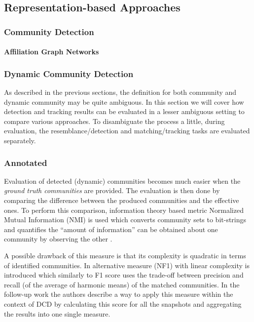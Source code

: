 \documentclass[
acmsmall,
nonacm,
screen,
acmthm]{../../scripts/pandoc/templates/acmart}
\begin{document}
\hypertarget{representation-based-approaches}{%
\subsection{Representation-based
Approaches}\label{representation-based-approaches}}

\hypertarget{community-detection-2}{%
\subsubsection{Community Detection}\label{community-detection-2}}

\hypertarget{affiliation-graph-networks}{%
\paragraph{Affiliation Graph
Networks}\label{affiliation-graph-networks}}

\hypertarget{dynamic-community-detection-1}{%
\subsubsection{Dynamic Community
Detection}\label{dynamic-community-detection-1}}

As described in the previous sections, the definition for both community
and dynamic community may be quite ambiguous. In this section we will
cover how detection and tracking results can be evaluated in a lesser
ambiguous setting to compare various approaches. To disambiguate the
process a little, during evaluation, the resemblance/detection and
matching/tracking tasks are evaluated separately.

\hypertarget{annotated}{%
\subsubsection{Annotated}\label{annotated}}

Evaluation of detected (dynamic) communities becomes much easier when
the \emph{ground truth communities} are provided. The evaluation is then
done by comparing the difference between the produced communities and
the effective ones. To perform this comparison, information theory based
metric Normalized Mutual Information (NMI) is used which converts
community sets to bit-strings and quantifies the ``amount of
information'' can be obtained about one community by observing the other
\citep{lancichinettiDetectingOverlappingHierarchical2009}.

A possible drawback of this measure is that its complexity is quadratic
in terms of identified communities. In
\citep{rossettiNovelApproachEvaluate2016} alternative measure (NF1) with
linear complexity is introduced which similarly to F1 score uses the
trade-off between precision and recall (of the average of harmonic
means) of the matched communities. In the follow-up work
\citep{rossettiANGELEfficientEffective2020} the authors describe a way
to apply this measure within the context of DCD by calculating this
score for all the snapshots and aggregating the results into one single
measure.
\end{document}

